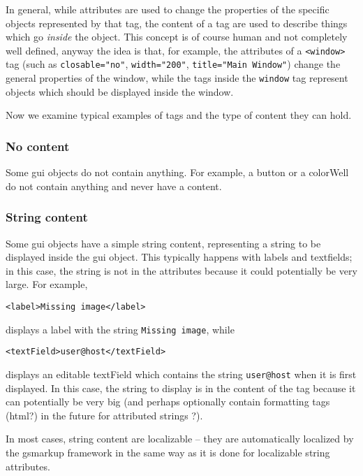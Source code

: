 In general, while attributes are used to change the properties of the
specific objects represented by that tag, the content of a tag are
used to describe things which go {\sl inside} the object.  This
concept is of course human and not completely well defined, anyway the
idea is that, for example, the attributes of a \texttt{<window>} tag
(such as \texttt{closable="no"}, \texttt{width="200"},
\texttt{title="Main Window"}) change the general properties of the
window, while the tags inside the \texttt{window} tag represent
objects which should be displayed inside the window.

Now we examine typical examples of tags and the type of content they
can hold.

\subsubsection{No content}
Some gui objects do not contain anything.  For example, a button or a
colorWell do not contain anything and never have a content.

\subsubsection{String content}
Some gui objects have a simple string content, representing a string
to be displayed inside the gui object.  This typically happens with
labels and textfields; in this case, the string is not in the
attributes because it could potentially be very large.  For example,
\begin{verbatim}
<label>Missing image</label>
\end{verbatim}
displays a label with the string \texttt{Missing image}, while
\begin{verbatim}
<textField>user@host</textField>
\end{verbatim}
displays an editable textField which contains the string
\texttt{user@host} when it is first displayed.  In this case, the string 
to display is in the content of the tag because it can potentially be
very big (and perhaps optionally contain formatting tags (html?) in
the future for attributed strings ?).

In most cases, string content are localizable -- they are
automatically localized by the gsmarkup framework in the same way as it is
done for localizable string attributes.

